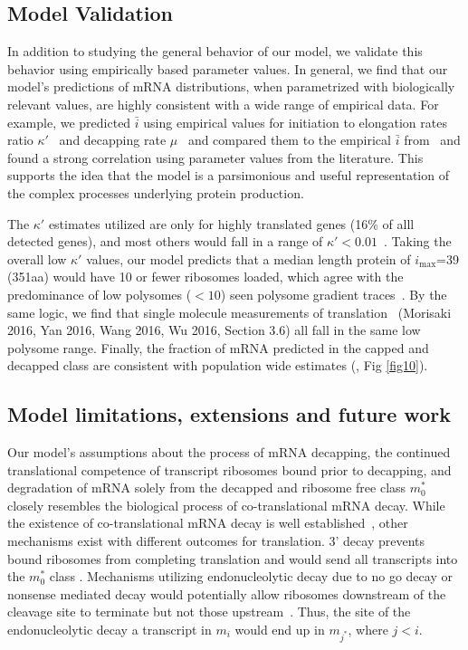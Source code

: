 \documentclass[10pt,letterpaper]{article}
\newcommand{\imax}{\ensuremath{{i_{\max}}}\xspace}
\newcommand{\MRL}{\ensuremath{\bar{i}}\xspace}
\begin{document}
\subsection*{Model Validation}

In addition to studying the general behavior of our model, we validate this behavior using empirically based parameter values.
In general, we find that our model's predictions of mRNA distributions, when parametrized with biologically relevant values, are highly consistent with a wide range of empirical data.
For example, we predicted \MRL using empirical values for initiation to elongation rates ratio $\kappa'$~\cite{RN13} and decapping rate $\mu$~\cite{RN27} and compared them to the empirical \MRL from~\cite{RN29} and found a strong correlation using parameter values from the literature. This supports the idea that the model is a parsimonious and useful representation of the complex processes underlying protein production.

The $\kappa'$ estimates utilized are only for highly translated genes (16\% of alll detected genes), and most others would fall in a range of $\kappa'<0.01$~\cite{RN13}.
Taking the overall low $\kappa'$ values, our model predicts that a median length protein of \imax =39 (351aa) would have 10 or fewer ribosomes loaded, which agree with the predominance of low polysomes ($<10$) seen polysome gradient traces~\cite{RN35, RN36}. 
By the same logic, we find that single molecule measurements of translation~\cite{RN30,RN32,RN33,RN31} (Morisaki 2016, Yan 2016, Wang 2016, Wu 2016, Section 3.6) all fall in the same low polysome range.
Finally, the fraction of mRNA predicted in the capped and decapped class  are consistent with population wide estimates (\cite{RN4}, Fig \ref{fig10}). 


\subsection*{Model limitations, extensions and future work}

Our model's assumptions about the process of mRNA decapping, the continued translational competence of transcript ribosomes bound prior to decapping, and degradation of mRNA solely from the decapped and ribosome free class $m_0^*$  closely resembles the biological process of co-translational mRNA decay. While the existence of co-translational mRNA decay is well established~\cite{RN4,RN28}, other mechanisms exist with different outcomes for translation. 3' decay prevents bound ribosomes from completing translation and would send all transcripts into the $m_0^*$ class . Mechanisms utilizing endonucleolytic decay due to no go decay or nonsense mediated decay would potentially allow ribosomes downstream of the cleavage site to terminate but not those upstream~\cite{RN38,RN2}. Thus,  the site of the endonucleolytic decay a transcript in $m_i$ would end up in $m_{j^*}$, where $j < i$.
\end{document}
